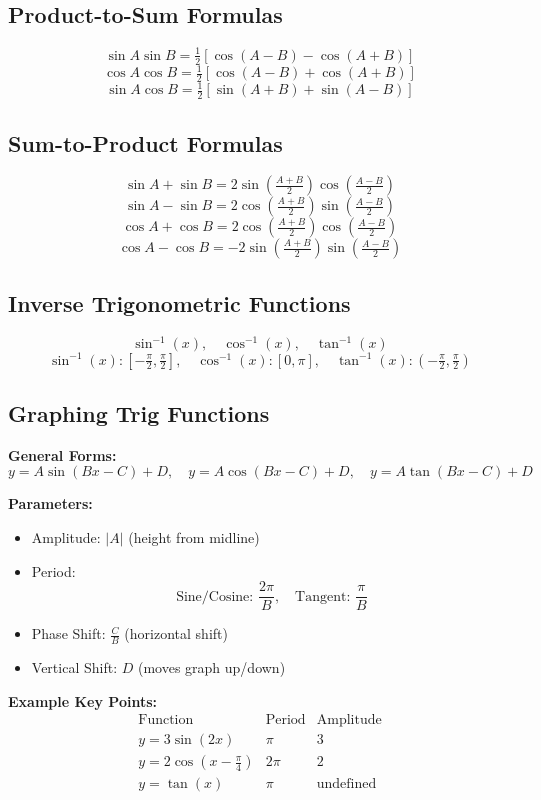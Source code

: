 \documentclass[12pt]{article}
\begin{document}
\subsection*{Product-to-Sum Formulas}
\[
\sin A \sin B = \tfrac{1}{2}[\cos(A-B) - \cos(A+B)]
\]
\[
\cos A \cos B = \tfrac{1}{2}[\cos(A-B) + \cos(A+B)]
\]
\[
\sin A \cos B = \tfrac{1}{2}[\sin(A+B) + \sin(A-B)]
\]

\subsection*{Sum-to-Product Formulas}
\[
\sin A + \sin B = 2 \sin \left(\tfrac{A+B}{2}\right) \cos \left(\tfrac{A-B}{2}\right)
\]
\[
\sin A - \sin B = 2 \cos \left(\tfrac{A+B}{2}\right) \sin \left(\tfrac{A-B}{2}\right)
\]
\[
\cos A + \cos B = 2 \cos \left(\tfrac{A+B}{2}\right) \cos \left(\tfrac{A-B}{2}\right)
\]
\[
\cos A - \cos B = -2 \sin \left(\tfrac{A+B}{2}\right) \sin \left(\tfrac{A-B}{2}\right)
\]

\subsection*{Inverse Trigonometric Functions}
\[
\sin^{-1}(x), \quad \cos^{-1}(x), \quad \tan^{-1}(x)
\]
\[
\sin^{-1}(x): \left[-\tfrac{\pi}{2}, \tfrac{\pi}{2}\right], \quad
\cos^{-1}(x): [0,\pi], \quad
\tan^{-1}(x): \left(-\tfrac{\pi}{2}, \tfrac{\pi}{2}\right)
\]

\subsection*{Graphing Trig Functions}

\textbf{General Forms:}
\[
y = A \sin(Bx - C) + D, \quad y = A \cos(Bx - C) + D, \quad y = A \tan(Bx - C) + D
\]

\textbf{Parameters:}
\begin{itemize}
    \item Amplitude: $|A|$ (height from midline)
    \item Period: 
    \[
    \text{Sine/Cosine: } \frac{2\pi}{B}, \quad 
    \text{Tangent: } \frac{\pi}{B}
    \]
    \item Phase Shift: $\frac{C}{B}$ (horizontal shift)
    \item Vertical Shift: $D$ (moves graph up/down)
\end{itemize}

\textbf{Example Key Points:}
\[
\begin{array}{c|c|c}
\text{Function} & \text{Period} & \text{Amplitude} \\
\hline
y = 3\sin(2x) & \pi & 3 \\
y = 2\cos\left(x - \frac{\pi}{4}\right) & 2\pi & 2 \\
y = \tan(x) & \pi & \text{undefined}
\end{array}
\]
\end{document}

